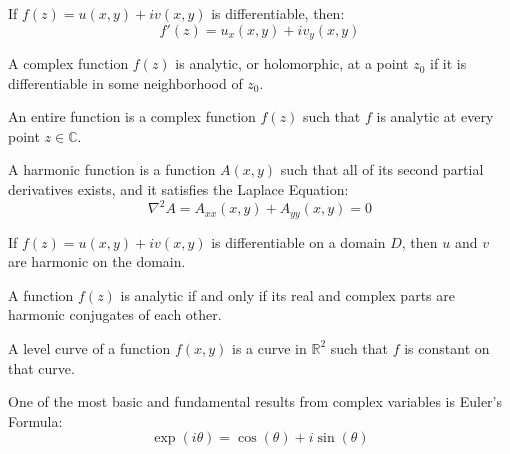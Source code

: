     \begin{theorem}
        If $f(z)=u(x,y)+iv(x,y)$ is differentiable,
        then:
        \begin{equation*}
            f'(z)=u_{x}(x,y)+iv_{y}(x,y)
        \end{equation*}
    \end{theorem}
    \begin{definition}
        A complex function $f(z)$ is analytic,
        or holomorphic, at a point $z_{0}$ if
        it is differentiable in some neighborhood of
        $z_{0}$.
    \end{definition}
    \begin{definition}
        An entire function is a complex function
        $f(z)$ such that $f$ is analytic at every
        point $z\in\mathbb{C}$.
    \end{definition}
    \begin{definition}
        A harmonic function is a function
        $A(x,y)$ such that all of its second
        partial derivatives exists, and it
        satisfies the Laplace Equation:
        \begin{equation*}
            \nabla^{2}A
            =A_{xx}(x,y)+A_{yy}(x,y)
            =0
        \end{equation*}
    \end{definition}
    \begin{theorem}
        If $f(z)=u(x,y)+iv(x,y)$ is differentiable
        on a domain $D$, then $u$ and $v$ are
        harmonic on the domain.
    \end{theorem}
    \begin{theorem}
        A function $f(z)$ is analytic if and only if
        its real and complex parts are harmonic
        conjugates of each other.
    \end{theorem}
    \begin{definition}
        A level curve of a function $f(x,y)$ is
        a curve in $\mathbb{R}^{2}$ such that
        $f$ is constant on that curve.
    \end{definition}
    One of the most basic and fundamental results from
    complex variables is Euler's Formula:
    \begin{equation*}
        \exp(i\theta)=\cos(\theta)+i\sin(\theta)
    \end{equation*}